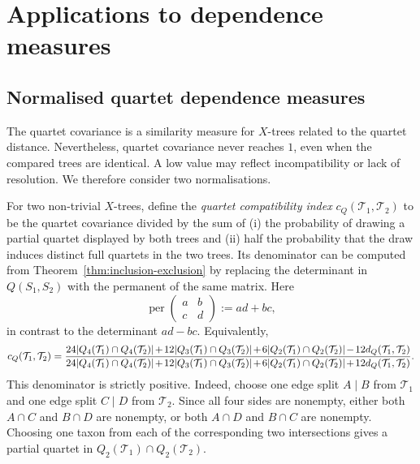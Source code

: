 \documentclass[pdflatex,sn-mathphys-num]{sn-jnl}
\theoremstyle{thmstyleone}
\begin{document}
\section{Applications to dependence measures}
\label{sec:statistical-consequences}

\subsection{Normalised quartet dependence measures}

The quartet covariance is a similarity measure for $X$-trees related to the
quartet distance.  Nevertheless, quartet covariance never reaches
$1$, even when the compared trees are identical.  A low value may reflect
incompatibility or lack of resolution.  We therefore consider two
normalisations.

For two non-trivial $X$-trees, define the \emph{quartet compatibility index}
$c_Q(\mathcal T_1,\mathcal T_2)$ to be the quartet covariance divided by the
sum of (i) the probability of drawing a partial quartet displayed by both
trees and (ii) half the probability that the draw induces distinct full
quartets in the two trees.  Its
denominator can be computed from Theorem~\ref{thm:inclusion-exclusion}
by replacing the determinant in $Q(S_1,S_2)$ with the permanent of the
same matrix.  Here
\[
\operatorname{per}\!\begin{pmatrix}a&b\\c&d\end{pmatrix}:=ad+bc,
\]
in contrast to the determinant $ad-bc$.  Equivalently,
\begingroup\footnotesize
\[
c_Q(\mathcal T_1,\mathcal T_2)=
\frac{
24|Q_4(\mathcal T_1)\cap Q_4(\mathcal T_2)|
\mkern-2mu+\mkern-2mu12|Q_3(\mathcal T_1)\cap Q_3(\mathcal T_2)|
\mkern-2mu+\mkern-2mu6|Q_2(\mathcal T_1)\cap Q_2(\mathcal T_2)|
\mkern-2mu-\mkern-2mu12d_Q(\mathcal T_1,\mathcal T_2)
}{
24|Q_4(\mathcal T_1)\cap Q_4(\mathcal T_2)|
\mkern-2mu+\mkern-2mu12|Q_3(\mathcal T_1)\cap Q_3(\mathcal T_2)|
\mkern-2mu+\mkern-2mu6|Q_2(\mathcal T_1)\cap Q_2(\mathcal T_2)|
\mkern-2mu+\mkern-2mu12d_Q(\mathcal T_1,\mathcal T_2)
}.
\]
\endgroup
This denominator is strictly positive.  Indeed, choose one edge split
$A\mid B$ from $\mathcal T_1$ and one edge split $C\mid D$ from
$\mathcal T_2$.  Since all four sides are nonempty, either both
$A\cap C$ and $B\cap D$ are nonempty, or both $A\cap D$ and $B\cap C$ are
nonempty.  Choosing one taxon from each of the corresponding two
intersections gives a partial quartet in
$Q_2(\mathcal T_1)\cap Q_2(\mathcal T_2)$.
\end{document}
